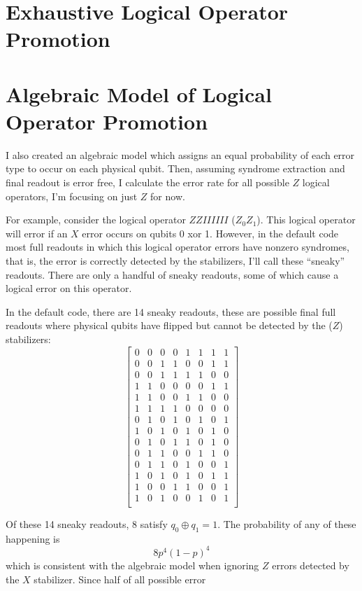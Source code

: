 \documentclass{article}
\begin{document}
\section{Exhaustive Logical Operator Promotion}

\section{Algebraic Model of Logical Operator Promotion}
I also created an algebraic model which assigns an equal probability of each error type to occur on each physical qubit. Then, assuming syndrome extraction and final readout is error free, I calculate the error rate for all possible $Z$ logical operators, I'm focusing on just $Z$ for now.

For example, consider the logical operator $ZZIIIIII$ ($Z_0Z_1$). This logical operator will error if an $X$ error occurs on qubits 0 xor 1. However, in the default code most full readouts in which this logical operator errors have nonzero syndromes, that is, the error is correctly detected by the stabilizers, I'll call these ``sneaky'' readouts. There are only a handful of sneaky readouts, some of which cause a logical error on this operator. 

In the default code, there are 14 sneaky readouts, these are possible final full readouts where physical qubits have flipped but cannot be detected by the ($Z$) stabilizers:
\[\begin{bmatrix}
    0 & 0 & 0 & 0 & 1 & 1 & 1 & 1\\
    0 & 0 & 1 & 1 & 0 & 0 & 1 & 1\\
    0 & 0 & 1 & 1 & 1 & 1 & 0 & 0\\
    1 & 1 & 0 & 0 & 0 & 0 & 1 & 1\\
    1 & 1 & 0 & 0 & 1 & 1 & 0 & 0\\
    1 & 1 & 1 & 1 & 0 & 0 & 0 & 0\\
    0 & 1 & 0 & 1 & 0 & 1 & 0 & 1\\
    1 & 0 & 1 & 0 & 1 & 0 & 1 & 0\\
    0 & 1 & 0 & 1 & 1 & 0 & 1 & 0\\
    0 & 1 & 1 & 0 & 0 & 1 & 1 & 0\\
    0 & 1 & 1 & 0 & 1 & 0 & 0 & 1\\
    1 & 0 & 1 & 0 & 1 & 0 & 1 & 1\\
    1 & 0 & 0 & 1 & 1 & 0 & 0 & 1\\
    1 & 0 & 1 & 0 & 0 & 1 & 0 & 1\\
\end{bmatrix}\]

Of these 14 sneaky readouts, 8 satisfy $q_0 \oplus q_1 = 1$. The probability of any of these happening is \[8p^4(1-p)^4\] which is consistent with the algebraic model when ignoring $Z$ errors detected by the $X$ stabilizer. Since half of all possible error 
\end{document}
